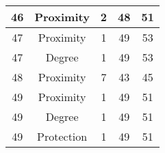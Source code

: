 \documentclass[results.tex]{subfiles}
\begin{document}
\begin{center}
\begin{tabular}{| c || c | c | c | c |}
    \hline
    46 & Proximity & 2 & 48 & 51 \\ 
    \hline
    47 & Proximity & 1 & 49 & 53 \\ 
    \hline
    47 & Degree & 1 & 49 & 53 \\ 
    \hline
    48 & Proximity & 7 & 43 & 45 \\ 
    \hline
    49 & Proximity & 1 & 49 & 51 \\ 
    \hline
    49 & Degree & 1 & 49 & 51 \\ 
    \hline
    49 & Protection & 1 & 49 & 51 \\ 
    \hline   \end{tabular}
\end{center}
\end{document}
